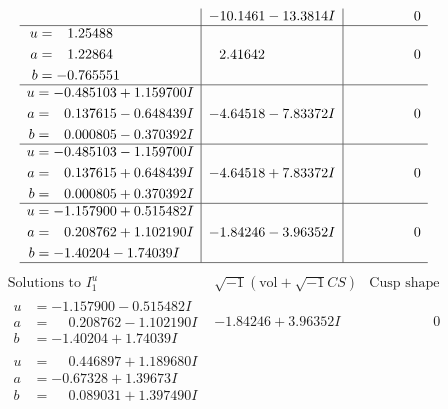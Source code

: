 \documentclass[1p]{elsarticle_modified}
\theoremstyle{definition}
\newcommand{\I}{\sqrt{-1}}
\begin{document}
$$\begin{array}{c|c|c}
 & -10.1461 - 13.3814 I & \phantom{-0.000000 } 0 \\ \hline\begin{aligned}
u &= \phantom{-}1.25488\phantom{ +0.000000I} \\
a &= \phantom{-}1.22864\phantom{ +0.000000I} \\
b &= -0.765551\phantom{ +0.000000I}\end{aligned}
 & \phantom{-}2.41642\phantom{ +0.000000I} & \phantom{-0.000000 } 0 \\ \hline\begin{aligned}
u &= -0.485103 + 1.159700 I \\
a &= \phantom{-}0.137615 - 0.648439 I \\
b &= \phantom{-}0.000805 - 0.370392 I\end{aligned}
 & -4.64518 - 7.83372 I & \phantom{-0.000000 } 0 \\ \hline\begin{aligned}
u &= -0.485103 - 1.159700 I \\
a &= \phantom{-}0.137615 + 0.648439 I \\
b &= \phantom{-}0.000805 + 0.370392 I\end{aligned}
 & -4.64518 + 7.83372 I & \phantom{-0.000000 } 0 \\ \hline\begin{aligned}
u &= -1.157900 + 0.515482 I \\
a &= \phantom{-}0.208762 + 1.102190 I \\
b &= -1.40204 - 1.74039 I\end{aligned}
 & -1.84246 - 3.96352 I & \phantom{-0.000000 } 0\\
 \hline 
 \end{array}$$\newpage$$\begin{array}{c|c|c}  
\text{Solutions to }I^u_{1}& \I (\text{vol} + \sqrt{-1}CS) & \text{Cusp shape}\\
 \hline 
\begin{aligned}
u &= -1.157900 - 0.515482 I \\
a &= \phantom{-}0.208762 - 1.102190 I \\
b &= -1.40204 + 1.74039 I\end{aligned}
 & -1.84246 + 3.96352 I & \phantom{-0.000000 } 0 \\ \hline\begin{aligned}
u &= \phantom{-}0.446897 + 1.189680 I \\
a &= -0.67328 + 1.39673 I \\
b &= \phantom{-}0.089031 + 1.397490 I\end{aligned}

\end{array}$$
\end{document}
